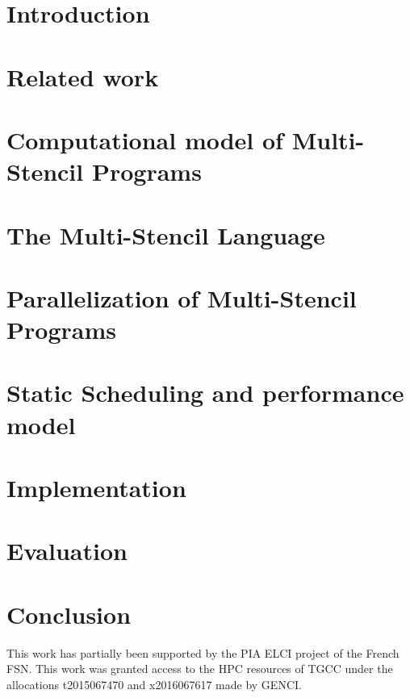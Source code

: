 \documentclass[twoside]{article}
\begin{document}
\section{Introduction}
\label{sect:introduction}

\section{Related work}
\label{sect:rel}

\section{Computational model of Multi-Stencil Programs}
\label{sect:formalism}

\section{The Multi-Stencil Language}
\label{sect:msl}

\section{Parallelization of Multi-Stencil Programs}
\label{sect:parallelism}

\section{Static Scheduling and performance model}
\label{sect:msp}

\section{Implementation}
\label{sect:comp}

\section{Evaluation}
\label{sect:eval}

\section{Conclusion}
\label{sect:concl}


This work has partially been supported by the PIA ELCI project of the French FSN.
This  work  was  granted  access  to  the  HPC  resources  of TGCC under  the 
allocations t2015067470 and x2016067617 made by GENCI.



\end{document}
